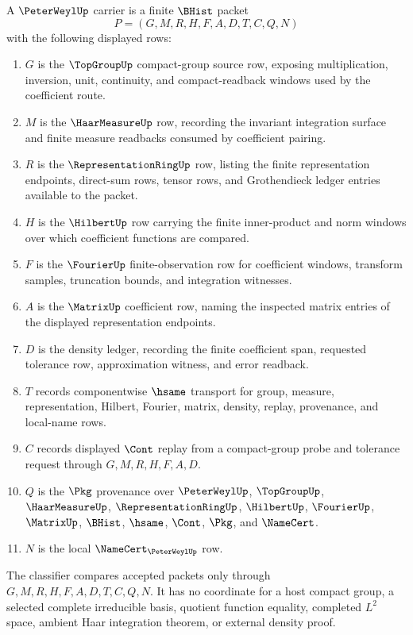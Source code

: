 \begin{definition}
\label{def:peter-weyl-carrier}
A $\PeterWeylUp$ carrier is a finite $\BHist$ packet
$$
P=(G,M,R,H,F,A,D,T,C,Q,N)
$$
with the following displayed rows:
\begin{enumerate}
\item $G$ is the $\TopGroupUp$ compact-group source row, exposing multiplication, inversion, unit, continuity, and compact-readback windows used by the coefficient route.
\item $M$ is the $\HaarMeasureUp$ row, recording the invariant integration surface and finite measure readbacks consumed by coefficient pairing.
\item $R$ is the $\RepresentationRingUp$ row, listing the finite representation endpoints, direct-sum rows, tensor rows, and Grothendieck ledger entries available to the packet.
\item $H$ is the $\HilbertUp$ row carrying the finite inner-product and norm windows over which coefficient functions are compared.
\item $F$ is the $\FourierUp$ finite-observation row for coefficient windows, transform samples, truncation bounds, and integration witnesses.
\item $A$ is the $\MatrixUp$ coefficient row, naming the inspected matrix entries of the displayed representation endpoints.
\item $D$ is the density ledger, recording the finite coefficient span, requested tolerance row, approximation witness, and error readback.
\item $T$ records componentwise $\hsame$ transport for group, measure, representation, Hilbert, Fourier, matrix, density, replay, provenance, and local-name rows.
\item $C$ records displayed $\Cont$ replay from a compact-group probe and tolerance request through $G,M,R,H,F,A,D$.
\item $Q$ is the $\Pkg$ provenance over $\PeterWeylUp$, $\TopGroupUp$, $\HaarMeasureUp$, $\RepresentationRingUp$, $\HilbertUp$, $\FourierUp$, $\MatrixUp$, $\BHist$, $\hsame$, $\Cont$, $\Pkg$, and $\NameCert$.
\item $N$ is the local $\NameCert_{\PeterWeylUp}$ row.
\end{enumerate}
The classifier compares accepted packets only through $G,M,R,H,F,A,D,T,C,Q,N$. It has no coordinate for a host compact group, a selected complete irreducible basis, quotient function equality, completed $L^2$ space, ambient Haar integration theorem, or external density proof.
\end{definition}

